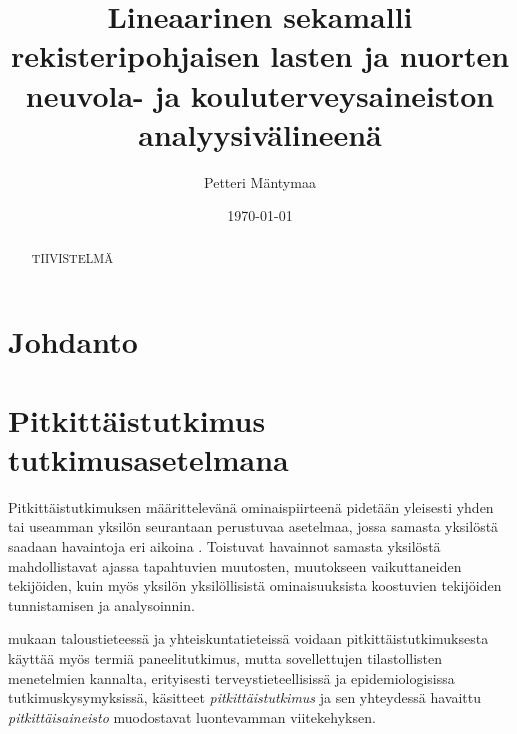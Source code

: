 \documentclass[finnish]{docopts}
\begin{document}
\singlespacing

\title{Lineaarinen sekamalli rekisteripohjaisen lasten ja nuorten neuvola- ja kouluterveysaineiston analyysivälineenä}
\author{Petteri Mäntymaa}
\date{\today}

\maketitle



\begin{abstract}

TIIVISTELMÄ

\end{abstract}

\mytableofcontents

\section{Johdanto}
\label{sec:johdanto}

\section{Pitkittäistutkimus tutkimusasetelmana}
\label{sec:pitkittaistutkimus}

Pitkittäistutkimuksen määrittelevänä ominaispiirteenä pidetään yleisesti yhden tai useamman yksilön seurantaan perustuvaa asetelmaa, jossa samasta yksilöstä saadaan havaintoja eri aikoina \citep{diggle02, fitzmaurice11, twisk13, laird82}. Toistuvat havainnot samasta yksilöstä mahdollistavat ajassa tapahtuvien muutosten, muutokseen vaikuttaneiden tekijöiden, kuin myös yksilön yksilöllisistä ominaisuuksista koostuvien tekijöiden tunnistamisen ja analysoinnin.

\cite{diggle02} mukaan taloustieteessä ja yhteiskuntatieteissä voidaan pitkittäistutkimuksesta käyttää myös termiä paneelitutkimus, mutta sovellettujen tilastollisten menetelmien kannalta, erityisesti terveystieteellisissä ja epidemiologisissa tutkimuskysymyksissä, käsitteet \textit{pitkittäistutkimus} ja sen yhteydessä havaittu \textit{pitkittäisaineisto} muodostavat luontevamman viitekehyksen.
\end{document}
